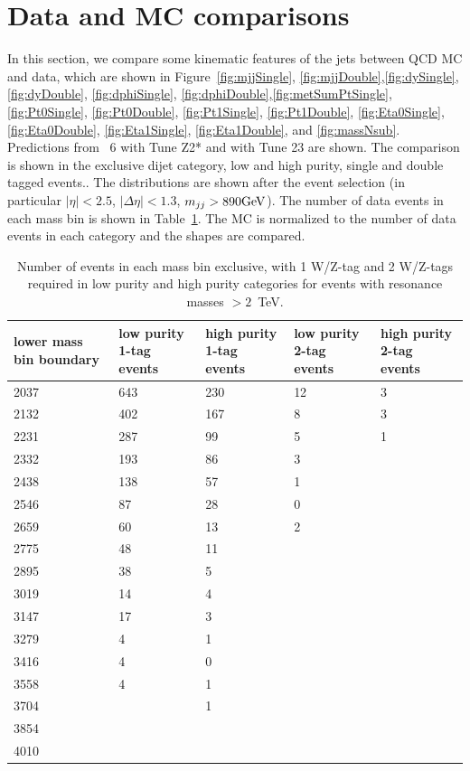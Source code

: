 \newpage
\section{Data and MC comparisons}
\label{sec:data-mc-comp}

In this section, we compare some kinematic features of the jets between QCD MC and data, which are
 shown in Figure~\ref{fig:mjjSingle}, \ref{fig:mjjDouble},\ref{fig:dySingle}, \ref{fig:dyDouble}, \ref{fig:dphiSingle}, 
\ref{fig:dphiDouble},\ref{fig:metSumPtSingle},
\ref{fig:Pt0Single}, \ref{fig:Pt0Double}, \ref{fig:Pt1Single}, \ref{fig:Pt1Double},
\ref{fig:Eta0Single}, \ref{fig:Eta0Double}, \ref{fig:Eta1Single}, \ref{fig:Eta1Double},
and \ref{fig:massNsub}.
Predictions from \PYTHIA~6 with Tune Z2* and \HERWIG{++} with Tune 23 are shown.
The comparison is shown in the exclusive dijet category, low and high purity,  single and double tagged events..
The distributions are shown after the event selection (in particular $|\eta| < 2.5$, $|\Delta\eta|<1.3$, $m_{jj} > 890  \mathrm{GeV}$).
The number of data events in each mass bin is shown in Table~\ref{table:eventnumbers}.
The MC is normalized to the number of data events in each category and the shapes are compared.


\begin{table}[htb]
\begin{tabular}{|p{2.5cm}|p{2.5cm}|p{2.5cm}|p{2.5cm}|p{2.5cm}|}
\hline
lower mass bin boundary& low purity 1-tag events & high purity 1-tag events& low purity 2-tag events& high purity 2-tag events\\
\hline
2037 & 643 & 230 & 12 & 3 \\ 
2132 & 402 & 167 & 8 & 3 \\ 
2231 & 287 & 99 & 5 & 1 \\ 
2332 & 193 & 86 & 3 &  \\ 
2438 & 138 & 57 & 1 &  \\ 
2546 & 87 & 28 & 0 &  \\ 
2659 & 60 & 13 & 2 &  \\ 
2775 & 48 & 11 &  &  \\ 
2895 & 38 & 5 &  &  \\ 
3019 & 14 & 4 &  &  \\ 
3147 & 17 & 3 &  &  \\ 
3279 & 4 & 1 &  &  \\ 
3416 & 4 & 0 &  &  \\ 
3558 & 4 & 1 &  &  \\ 
3704 &  & 1 &  &  \\ 
3854 &  &  &  &  \\ 
4010 &  &  &  &  \\ 
\hline
\end{tabular}
\caption{Number of events in each mass bin exclusive, with 1 W/Z-tag and  2 W/Z-tags required in low
purity and high purity categories for events with resonance masses $>2$~TeV.}
\label{table:eventnumbers}
\end{table}



